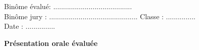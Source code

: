 \documentclass[oneside,12pt]{exam}          %
\begin{document}
\firstpageheader
{Binôme évalué: ........................................\\[2mm]
Binôme jury : ............................................. }
{}
{Classe : ............... \\[2mm] Date : ...............}

\footer
{}
{\footnotesize \etablissement}
{}


\vspace{-1cm}\hrulefill\raisebox{-1.9pt}{\quad\decofourleft~\decosix~\decofourright \quad}\hrulefill

\begin{center}
	\textbf{\large Présentation orale évaluée}
\end{center}

\end{document}
